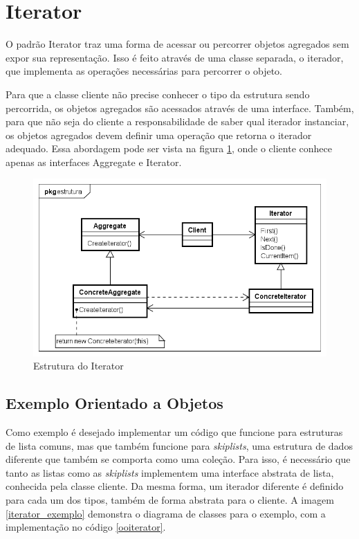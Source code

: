 \section{Iterator}

O padrão Iterator traz uma forma de acessar ou 
percorrer objetos agregados sem expor sua representação. 
Isso é feito através de uma classe separada, o iterador, 
que implementa as operações necessárias para percorrer 
o objeto. \cite{gamma:1995}

Para que a classe cliente não precise conhecer o tipo 
da estrutura sendo percorrida, os objetos agregados 
são acessados através de uma interface. Também, para 
que não seja do cliente a responsabilidade de saber 
qual iterador instanciar, os objetos agregados devem 
definir uma operação que retorna o iterador adequado. 
Essa abordagem pode ser vista na figura \ref{iterator_struct}, 
onde o cliente conhece apenas as interfaces 
Aggregate e Iterator.

\begin{figure}[htb]
	\caption{\label{iterator_struct}Estrutura do Iterator}
	\begin{center}
	    \includegraphics[scale=0.5]{5_padroes-contexto-funcional/5.3_comportamentais/5.3.04_iterator/iterator_struct.png}
	\end{center}
\end{figure}

\subsection*{Exemplo Orientado a Objetos}

Como exemplo é desejado implementar um código 
que funcione para estruturas de lista comuns, mas 
que também funcione para \textit{skiplists}, uma 
estrutura de dados diferente que também se comporta 
como uma coleção. Para isso, é necessário que 
tanto as listas como as \textit{skiplists} implementem 
uma interface abstrata de lista, conhecida pela 
classe cliente. Da mesma forma, um iterador diferente 
é definido para cada um dos tipos, também de forma 
abstrata para o cliente. A imagem \ref{iterator_exemplo} 
demonstra o diagrama de classes para o exemplo, com a 
implementação no código \ref{ooiterator}.

